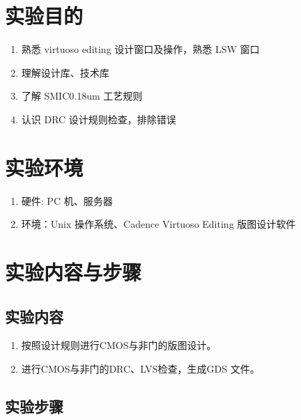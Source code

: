 \documentclass{theme-2614084}
\begin{document}

\makecover


\section{实验目的}

\begin{enumerate}
  \item 熟悉 virtuoso editing 设计窗口及操作，熟悉 LSW 窗口
  \item 理解设计库、技术库
  \item 了解 SMIC0.18um 工艺规则
  \item 认识 DRC 设计规则检查，排除错误
\end{enumerate}

\section{实验环境}

\begin{enumerate}
  \item 硬件: PC 机、服务器
  \item 环境：Unix 操作系统、Cadence Virtuoso Editing 版图设计软件
\end{enumerate}

\section{实验内容与步骤}


\subsection{实验内容}

\begin{enumerate}
  \item 按照设计规则进行CMOS与非门的版图设计。
  \item 进行CMOS与非门的DRC、LVS检查，生成GDS 文件。
\end{enumerate}

\subsection{实验步骤}
\end{document}
